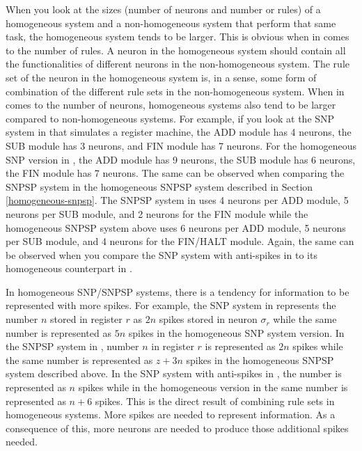 \documentclass[smallextended]{svjour3}
\begin{document}
When you look at the sizes (number of neurons and number or rules) of a homogeneous system and a 
non-homogeneous system that perform that same task, the homogeneous system tends to be larger.
This is obvious when in comes to the number of rules. A neuron in the homogeneous system should 
contain all the functionalities of different neurons in the non-homogeneous system. The rule set of
the neuron in the homogeneous system is, in a sense, some form of combination of the different 
rule sets in the non-homogeneous system. When in comes to the number of neurons, homogeneous systems
also tend to be larger compared to non-homogeneous systems. For example, if you look at the SNP
system in \cite{ionescu-2006-snp} that simulates a register machine, the ADD module has 4 neurons, 
the SUB module has 3 neurons, and FIN module has 7 neurons. For the homogeneous SNP version in
\cite{HSNP}, the ADD module has 9 neurons, the SUB module has 6 neurons, the FIN module has 7 neurons.
The same can be observed when comparing the SNPSP system in \cite{cabarle-2015-structural-plasticity}
the homogeneous SNPSP system described in Section \ref{homogeneous-snpsp}. The SNPSP system in
\cite{cabarle-2015-structural-plasticity} uses 4 neurons per ADD module, 5 neurons per SUB module,
and 2 neurons for the FIN module while the homogeneous SNPSP system above uses 6 neurons per ADD
module, 5 neurons per SUB module, and 4 neurons for the FIN/HALT module. Again, the same can be
observed when you compare the SNP system with anti-spikes in \cite{pan-2009-anti-spikes} to its
homogeneous counterpart in \cite{HSNP-A}.

In homogeneous SNP/SNPSP systems, there is a tendency for information to be represented with more
spikes. For example, the SNP system in \cite{ionescu-2006-snp} represents the number $n$ stored in
register $r$ as $2n$ spikes stored in neuron $\sigma_r$ while the same number is represented as 
$5n$ spikes in the homogeneous SNP system version. In the SNPSP system in 
\cite{cabarle-2015-structural-plasticity}, number $n$ in register $r$ is represented as $2n$ spikes
while the same number is represented as $z+3n$ spikes in the homogeneous SNPSP system described 
above. In the SNP system with anti-spikes in \cite{pan-2009-anti-spikes}, the number is represented
as $n$ spikes while in the homogeneous version in \cite{HSNP-A} the same number is represented as
$n+6$ spikes. This is the direct result of combining rule sets in homogeneous systems. More spikes
are needed to represent information. As a consequence of this, more neurons are needed to produce 
those additional spikes needed.
\end{document}
